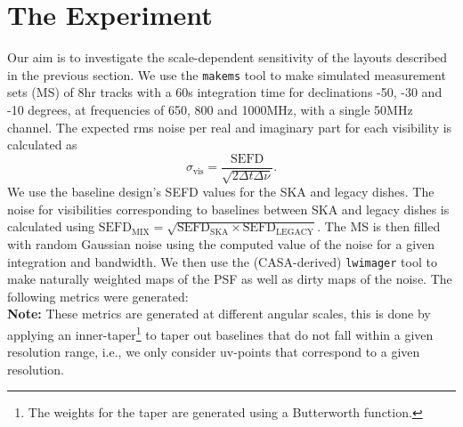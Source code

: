 \documentclass[sfheadings,a4paper,times,9pt,floats,floatfix]{article}
\begin{document}
\section{The Experiment}\label{sec:exp}
Our aim is to investigate the scale-dependent sensitivity of the layouts described in the previous section.
We use the \texttt{makems} tool to make simulated measurement sets (MS) of 8hr tracks with a 60s integration time for
declinations -50, -30 and -10 degrees, at frequencies of 650, 800 and 1000MHz, with a single 50MHz channel. The expected rms noise
per real and imaginary part for each visibility is calculated as 
\begin{equation}
\sigma_{\text{vis}} = \frac{\text{SEFD}}{\sqrt{2\Delta t\Delta \nu}}.
\end{equation}
We use the baseline design's SEFD values for the SKA and legacy dishes. The noise for visibilities corresponding to baselines
between SKA and legacy dishes is calculated using $\text{SEFD}_{\text{MIX}}=\sqrt{\text{SEFD}_{\text{SKA}} \times
\text{SEFD}_{\text{LEGACY}}}$. The MS is then filled with random Gaussian noise using the computed value of the noise for a
given integration and bandwidth. We then use the (CASA-derived) \texttt{lwimager} tool to make naturally weighted maps of the PSF
as well as dirty maps of the noise. The following metrics were generated:\\ {\bf Note:} These metrics are generated at different
angular scales, this is done by applying an inner-taper\footnote{The weights for the taper are generated using a Butterworth
function.} to taper out baselines that do not fall within a given resolution range, i.e., we only consider uv-points that
correspond to a given resolution.
\end{document}
